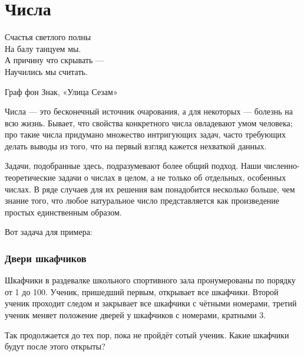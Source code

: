 \chapter*{Числа}

\epigraph{Счастья светлого полны\\ %
На балу танцуем мы.\\ %
А причину что скрывать ---\\ %
Научились мы считать.}{Граф фон Знак, «Улица Сезам»}


 

Числа --- это бесконечный источник очарования, а для некоторых --- болезнь на всю жизнь. %
Бывает, что свойства конкретного числа овладевают умом человека;
про такие числа придумано множество интригующих задач,
часто требующих делать выводы из того, что на первый взгляд кажется нехваткой данных.

Задачи, подобранные здесь, подразумевают %
более общий подход. %
Наши численно-теоретические задачи о числах в целом, а не только об отдельных, особенных числах.
В ряде случаев для их решения вам понадобится несколько больше, чем знание того, 
что любое натуральное число представляется как произведение простых единственным образом.

\medskip

Вот задача для примера:

\subsection*{Двери шкафчиков}%

Шкафчики в раздевалке школьного спортивного зала пронумерованы по порядку от 1 до 100.
Ученик, пришедший первым, открывает все шкафчики.
Второй ученик проходит следом и закрывает все шкафчики с чётными номерами, третий ученик меняет положение дверей у шкафчиков с номерами, кратными 3.

Так продолжается до тех пор, пока не пройдёт сотый ученик.
Какие шкафчики будут после этого открыты?
 
